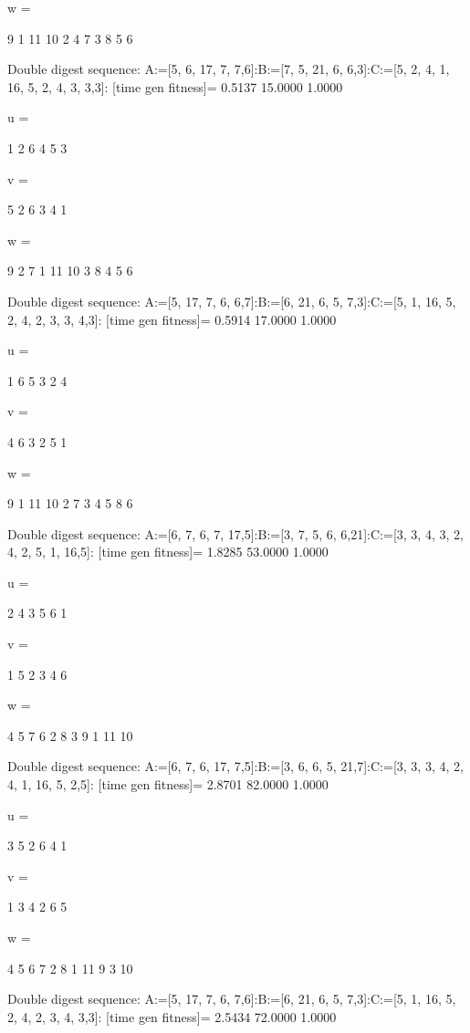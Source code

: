 w =

     9     1    11    10     2     4     7     3     8     5     6

Double digest sequence:
A:=[5, 6, 17, 7, 7,6]:B:=[7, 5, 21, 6, 6,3]:C:=[5, 2, 4, 1, 16, 5, 2, 4, 3, 3,3]:
[time gen fitness]=
    0.5137   15.0000    1.0000


u =

     1     2     6     4     5     3


v =

     5     2     6     3     4     1


w =

     9     2     7     1    11    10     3     8     4     5     6

Double digest sequence:
A:=[5, 17, 7, 6, 6,7]:B:=[6, 21, 6, 5, 7,3]:C:=[5, 1, 16, 5, 2, 4, 2, 3, 3, 4,3]:
[time gen fitness]=
    0.5914   17.0000    1.0000


u =

     1     6     5     3     2     4


v =

     4     6     3     2     5     1


w =

     9     1    11    10     2     7     3     4     5     8     6

Double digest sequence:
A:=[6, 7, 6, 7, 17,5]:B:=[3, 7, 5, 6, 6,21]:C:=[3, 3, 4, 3, 2, 4, 2, 5, 1, 16,5]:
[time gen fitness]=
    1.8285   53.0000    1.0000


u =

     2     4     3     5     6     1


v =

     1     5     2     3     4     6


w =

     4     5     7     6     2     8     3     9     1    11    10

Double digest sequence:
A:=[6, 7, 6, 17, 7,5]:B:=[3, 6, 6, 5, 21,7]:C:=[3, 3, 3, 4, 2, 4, 1, 16, 5, 2,5]:
[time gen fitness]=
    2.8701   82.0000    1.0000


u =

     3     5     2     6     4     1


v =

     1     3     4     2     6     5


w =

     4     5     6     7     2     8     1    11     9     3    10

Double digest sequence:
A:=[5, 17, 7, 6, 7,6]:B:=[6, 21, 6, 5, 7,3]:C:=[5, 1, 16, 5, 2, 4, 2, 3, 4, 3,3]:
[time gen fitness]=
    2.5434   72.0000    1.0000


